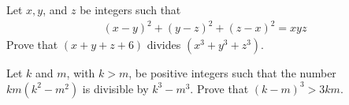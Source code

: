 \begin{problem}
	Let $x, y$, and $z$ be integers such that
		\begin{align*}
			(x-y)^2+(y-z)^2+(z-x)^2 = xyz
		\end{align*}
	Prove that $(x+y+z+6)$ divides $(x^3+y^3+z^3)$.
\end{problem}


\begin{problem}
	Let $k$ and $m$, with $k > m$, be positive integers such that the number $km(k^2 - m^2)$ is divisible by $k^3 - m^3$. Prove that $(k - m)^3 > 3km$. %
\end{problem}

%
%

